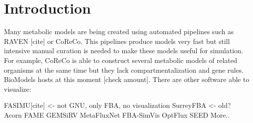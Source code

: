 \section{Introduction}
Many metabolic models are being created using automated pipelines such as RAVEN [cite] or CoReCo. This pipelines produce models very fast but still intensive manual curation is needed to make these models useful for simulation. For example, CoReCo is able to construct several metabolic models of related organisms at the same time but they lack compartmentalization and gene rules. BioModels hosts at this moment [check amount]. There are other software able to visualize:

FASIMU[cite] <- not GNU, only FBA, no visualization
SurreyFBA <- old?
Acorn
FAME
GEMSiRV
MetaFluxNet
FBA-SimVis
OptFlux
SEED
More..



